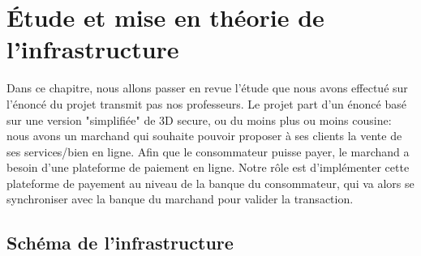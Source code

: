 \chapter{Étude et mise en théorie de l'infrastructure}

Dans ce chapitre, nous allons passer en revue l'étude que nous avons effectué sur l'énoncé du projet transmit pas nos professeurs. Le projet part d'un énoncé basé sur une version "simplifiée" de 3D secure, ou du moins plus ou moins cousine: nous avons un marchand qui souhaite pouvoir proposer à ses clients la vente de ses services/bien en ligne. Afin que le consommateur puisse payer, le marchand a besoin d'une plateforme de paiement en ligne. Notre rôle est d'implémenter cette plateforme de payement au niveau de la banque du consommateur, qui va alors se synchroniser avec la banque du marchand pour valider la transaction.

\section{Schéma de l'infrastructure}
